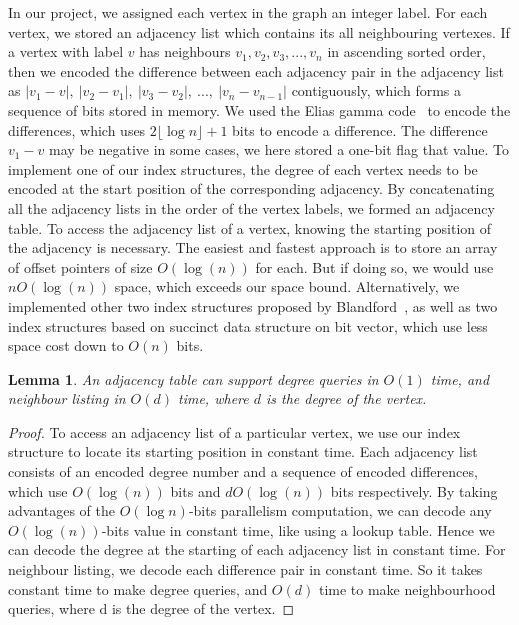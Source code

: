 \documentclass[12pt,glossary]{dalthesis}
\newtheorem{lemma}[theorem]{Lemma}
\begin{document}
In our project, we assigned each vertex in the graph an integer label. For each vertex, we stored an adjacency list which contains its all neighbouring vertexes. If a vertex with label $v$ has neighbours $v_{1}, v_{2}, v_{3}, ...,v_{n}$ in ascending sorted order, then we encoded the difference between each adjacency pair in the adjacency list as $|v_{1}-v|, \ |v_{2}-v_{1}|,\  |v_{3}-v_{2}|,\ ...,\ |v_{n}-v_{n-1}|$ contiguously, which forms a sequence of bits stored in memory. We used the Elias gamma code~\cite{Gamma} to encode the differences, which uses $2\lfloor \log n \rfloor + 1$ bits to encode a difference. The difference $v_{1} - v$ may be negative in some cases, we here stored a one-bit flag that value. To implement one of our index structures, the degree of each vertex needs to be encoded at the start position of the corresponding adjacency. By concatenating all the adjacency lists in the order of the vertex labels, we formed an adjacency table. To access the adjacency list of a vertex, knowing the starting position of the adjacency
is necessary. The easiest and fastest approach is to store an array of offset pointers of size $O(\log (n))$ for each. But if doing so, we would use $nO(\log (n))$ space, which exceeds our space bound. Alternatively, we implemented other two index structures proposed by Blandford~\cite{compact-representation}, as well as two index structures based on succinct data structure on bit vector, which use less space cost down to $O(n)$ bits.
\bigskip
\begin{lemma}
An adjacency table can support degree queries in $O(1)$ time, and neighbour
listing in $O(d)$ time, where $d$ is the degree of the vertex.
\end{lemma}
\bigskip 
\begin{proof}
To access an adjacency list of a particular vertex, we use our index structure to locate its starting position in constant time. Each adjacency list consists of an encoded degree number and a sequence of encoded differences, which use $O(\log (n))$ bits and $dO(\log (n))$ bits respectively. By taking advantages of the $O(\log n)$-bits parallelism computation, we can decode any $O(\log (n))$-bits value in constant time, like using a lookup table. Hence we can decode the degree at the starting of each adjacency list in constant time. For neighbour listing, we decode each difference pair in constant time. So it takes constant time to make degree queries, and $O(d)$ time to make neighbourhood queries, where d is the degree of the vertex.
\end{proof}
\end{document}
